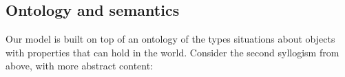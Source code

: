 \documentclass[floatsintext, doc]{apa6}
\newcommand{\mht}[1]{{\textcolor{Blue}{[mht: #1]}}}
\begin{document}
%



\subsection{Ontology and semantics}




Our model is built on top of an ontology of the types situations about objects with properties that can hold in the world.
Consider the second syllogism from above, with more abstract content:
\end{document}
